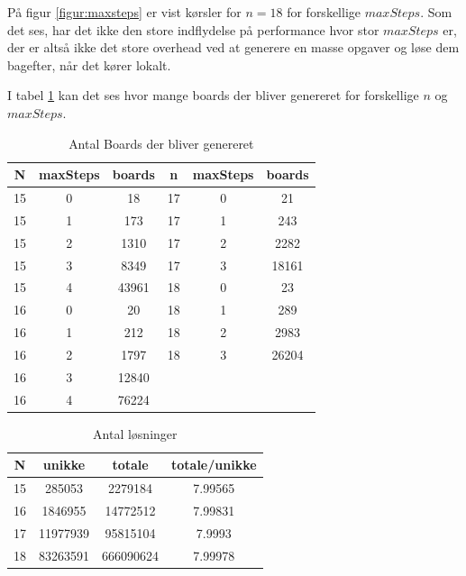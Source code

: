 På figur \ref{figur:maxsteps} er vist kørsler for $n=18$ for forskellige
$maxSteps$. 
Som det ses, har det ikke den store indflydelse på performance hvor stor
$maxSteps$ er, der er altså ikke det store overhead ved at generere en masse
opgaver og løse dem bagefter, når det kører lokalt. 




I tabel \ref{tabel:noboards} kan det ses hvor mange boards der bliver genereret
for forskellige $n$ og $maxSteps$. 

\begin{table}
	\begin{center}
		\begin{tabular}{|c|c|c|c|c|c|}
			\hline N  & maxSteps  & boards & n  & maxSteps & boards \\
			\hline 15 & 0         & 18     & 17 & 0        & 21     \\
			\hline 15 & 1         & 173    & 17 & 1        & 243    \\
			\hline 15 & 2         & 1310   & 17 & 2        & 2282   \\ 
			\hline 15 & 3         & 8349   & 17 & 3        & 18161  \\
			\hline 15 & 4         & 43961  & 18 & 0        & 23     \\
			\hline 16 & 0         & 20     & 18 & 1        & 289    \\
			\hline 16 & 1         & 212    & 18 & 2        & 2983   \\
			\hline 16 & 2         & 1797   & 18 & 3        & 26204  \\
			\hline 16 & 3         & 12840  &    &          &        \\
			\hline 16 & 4         & 76224  &    &          &        \\
			\hline
		\end{tabular}
		\caption{Antal Boards der bliver genereret}
		\label{tabel:noboards}
	\end{center}
\end{table}

\begin{table}
	\begin{center}
		\begin{tabular}{|c|c|c|c|}
			\hline N & unikke & totale & totale/unikke \\
			\hline 15 & 285053 & 2279184 & 7.99565 \\
			\hline 16 & 1846955 & 14772512 & 7.99831 \\
			\hline 17 & 11977939 & 95815104  & 7.9993 \\
			\hline 18 & 83263591 & 666090624 & 7.99978 \\
			\hline
		\end{tabular}
		\caption{Antal løsninger}
		\label{tabel:unikkevstotale}
	\end{center}
\end{table}

